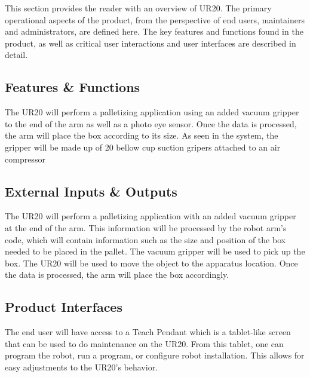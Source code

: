 This section provides the reader with an overview of UR20. The primary operational aspects of the product, from the perspective of end users, maintainers and administrators, are defined here. The key features and functions found in the product, as well as critical user interactions and user interfaces are described in detail.

\subsection{Features \& Functions}
The UR20 will perform a palletizing application using an added vacuum gripper to the end of the arm as well as a photo eye sensor. Once the data is processed, the arm will place the box according to its size. As seen in the system, the gripper will be made up of 20 bellow cup suction gripers  attached to an air compressor

\subsection{External Inputs \& Outputs}
The UR20 will perform a palletizing application with an added vacuum gripper at the end of the arm. This information will be processed by the robot arm's code, which will contain information such as the size and position of the box needed to be placed in the pallet. The vacuum gripper will be used to pick up the box. The UR20 will be used to move the object to the apparatus location. Once the data is processed, the arm will place the box accordingly. 

\subsection{Product Interfaces}
The end user will have access to a Teach Pendant which is a tablet-like screen that can be used to do maintenance on the UR20. From this tablet, one can program the robot, run a program, or configure robot installation. This allows for easy adjustments to the UR20's behavior.